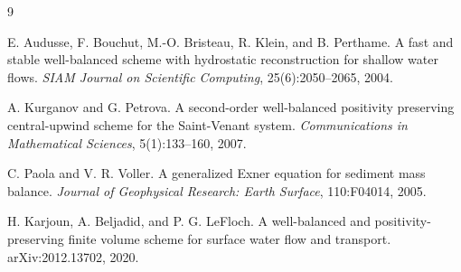 \begin{thebibliography}{9}

E. Audusse, F. Bouchut, M.-O. Bristeau, R. Klein, and B. Perthame.
\newblock A fast and stable well-balanced scheme with hydrostatic reconstruction for shallow water flows.
\newblock \emph{SIAM Journal on Scientific Computing}, 25(6):2050--2065, 2004.

A. Kurganov and G. Petrova.
\newblock A second-order well-balanced positivity preserving central-upwind scheme for the Saint-Venant system.
\newblock \emph{Communications in Mathematical Sciences}, 5(1):133--160, 2007.

C. Paola and V. R. Voller.
\newblock A generalized Exner equation for sediment mass balance.
\newblock \emph{Journal of Geophysical Research: Earth Surface}, 110:F04014, 2005.

H. Karjoun, A. Beljadid, and P. G. LeFloch.
\newblock A well-balanced and positivity-preserving finite volume scheme for surface water flow and transport.
\newblock arXiv:2012.13702, 2020.

\end{thebibliography}
